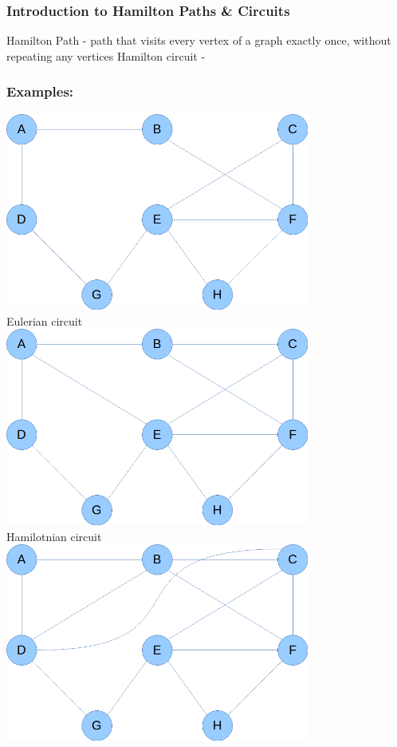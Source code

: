 \documentclass[10pt]{article}
\begin{document}
\subsubsection{Introduction to Hamilton Paths \& Circuits}
Hamilton Path - path that visits every vertex of a graph exactly once, without repeating any vertices
Hamilton circuit -
\subsubsection{Examples:}
\begin{center}
    \includegraphics[width=10cm]{e1.png}\\
    Eulerian circuit\\
    \includegraphics[width=10cm]{e2.png}\\
    Hamilotnian circuit\\
    \includegraphics[width=10cm]{e3.png}\\

\end{center}
\end{document}
